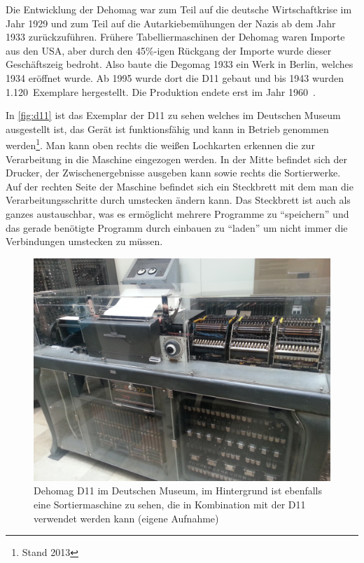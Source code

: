 \documentclass[parskip=half]{scrartcl}
\begin{document}
Die Entwicklung der Dehomag war zum Teil auf die deutsche Wirtschaftkrise im
Jahr 1929 und zum Teil auf die Autarkiebemühungen der Nazis ab dem Jahr 1933
zurückzuführen. Frühere Tabelliermaschinen der Dehomag waren Importe aus den
USA, aber durch den 45\%-igen Rückgang der Importe wurde dieser Geschäftszeig
bedroht. Also baute die Degomag 1933 ein Werk in Berlin, welches 1934 eröffnet
wurde. Ab 1995 wurde dort die D11 gebaut und bis 1943 wurden 1.120~Exemplare
hergestellt. Die Produktion endete erst im Jahr 1960~\cite{heide2009punched}.

In \autoref{fig:d11} ist das Exemplar der D11 zu sehen welches im Deutschen
Museum ausgestellt ist, das Gerät ist funktionsfähig und kann in Betrieb
genommen werden\footnote{Stand 2013}. Man kann oben rechts die weißen
Lochkarten erkennen die zur Verarbeitung in die Maschine eingezogen werden. In
der Mitte befindet sich der Drucker, der Zwischenergebnisse ausgeben kann sowie
rechts die Sortierwerke. Auf der rechten Seite der Maschine befindet sich ein
Steckbrett mit dem man die Verarbeitungsschritte durch umstecken ändern kann.
Das Steckbrett ist auch als ganzes austauschbar, was es ermöglicht mehrere
Programme zu \enquote{speichern} und das gerade benötigte Programm durch
einbauen zu \enquote{laden} um nicht immer die Verbindungen umstecken zu
müssen.

\begin{figure}[h]
  \centering
  \includegraphics[width=\textwidth]{d11}
  \caption{Dehomag D11 im Deutschen Museum, im Hintergrund ist ebenfalls eine
    Sortiermaschine zu sehen, die in Kombination mit der D11 verwendet werden
    kann (eigene Aufnahme)}
  \label{fig:d11}
\end{figure}
\end{document}
